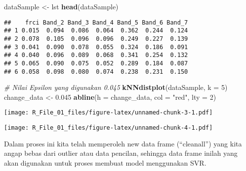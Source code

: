 \documentclass[]{article}
\newenvironment{Shaded}{\begin{snugshade}}{\end{snugshade}}
\newcommand{\KeywordTok}[1]{\textcolor[rgb]{0.13,0.29,0.53}{\textbf{#1}}}
\newcommand{\DataTypeTok}[1]{\textcolor[rgb]{0.13,0.29,0.53}{#1}}
\newcommand{\DecValTok}[1]{\textcolor[rgb]{0.00,0.00,0.81}{#1}}
\newcommand{\FloatTok}[1]{\textcolor[rgb]{0.00,0.00,0.81}{#1}}
\newcommand{\StringTok}[1]{\textcolor[rgb]{0.31,0.60,0.02}{#1}}
\newcommand{\CommentTok}[1]{\textcolor[rgb]{0.56,0.35,0.01}{\textit{#1}}}
\newcommand{\OperatorTok}[1]{\textcolor[rgb]{0.81,0.36,0.00}{\textbf{#1}}}
\newcommand{\NormalTok}[1]{#1}
\begin{document}
\begin{Shaded}
\begin{Highlighting}[]
\NormalTok{dataSample <-}\StringTok{ }\NormalTok{lst}
\KeywordTok{head}\NormalTok{(dataSample)}
\end{Highlighting}
\end{Shaded}

\begin{verbatim}
##    frci Band_2 Band_3 Band_4 Band_5 Band_6 Band_7
## 1 0.015  0.094  0.086  0.064  0.362  0.244  0.124
## 2 0.078  0.105  0.096  0.096  0.249  0.227  0.139
## 3 0.041  0.090  0.078  0.055  0.324  0.186  0.091
## 4 0.040  0.096  0.089  0.068  0.341  0.254  0.132
## 5 0.065  0.090  0.075  0.052  0.289  0.184  0.087
## 6 0.058  0.098  0.080  0.074  0.238  0.231  0.150
\end{verbatim}

\begin{Shaded}
\begin{Highlighting}[]
\CommentTok{# Nilai Epsilon yang digunakan 0.045}
\KeywordTok{kNNdistplot}\NormalTok{(dataSample, }\DataTypeTok{k =} \DecValTok{5}\NormalTok{)}
\NormalTok{change_data <-}\StringTok{ }\FloatTok{0.045}
\KeywordTok{abline}\NormalTok{(}\DataTypeTok{h =}\NormalTok{ change_data, }\DataTypeTok{col =} \StringTok{"red"}\NormalTok{, }\DataTypeTok{lty =} \DecValTok{2}\NormalTok{)}
\end{Highlighting}
\end{Shaded}

\texttt{[image: R\_File\_01\_files/figure-latex/unnamed-chunk-3-1.pdf]}

\begin{Shaded}
\end{Shaded}

\texttt{[image: R\_File\_01\_files/figure-latex/unnamed-chunk-4-1.pdf]}

Dalam proses ini kita telah memperoleh new data frame (``cleanall'')
yang kita angap bebas dari outlier atau data pencilan, sehingga data
frame inilah yang akan digunakan untuk proses membuat model menggunakan
SVR.
\end{document}
